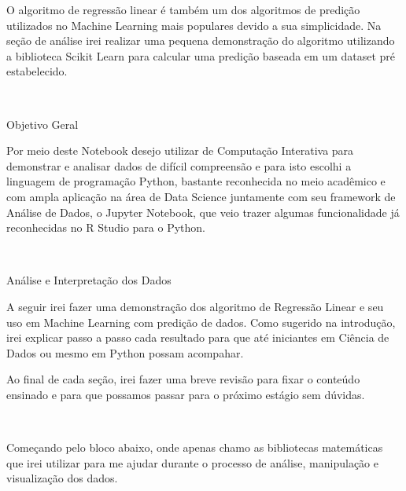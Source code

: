 \documentclass[11pt]{article}
\begin{document}
    O algoritmo de regressão linear é também um dos algoritmos de predição
utilizados no Machine Learning mais populares devido a sua simplicidade.
Na seção de análise irei realizar uma pequena demonstração do algoritmo
utilizando a biblioteca Scikit Learn para calcular uma predição baseada
em um dataset pré estabelecido.

    ~

    Objetivo Geral

    Por meio deste Notebook desejo utilizar de Computação Interativa para
demonstrar e analisar dados de difícil compreensão e para isto escolhi a
linguagem de programação Python, bastante reconhecida no meio acadêmico
e com ampla aplicação na área de Data Science juntamente com seu
framework de Análise de Dados, o Jupyter Notebook, que veio trazer
algumas funcionalidade já reconhecidas no R Studio para o Python.

    ~

    Análise e Interpretação dos Dados

    A seguir irei fazer uma demonstração dos algoritmo de Regressão Linear e
seu uso em Machine Learning com predição de dados. Como sugerido na
introdução, irei explicar passo a passo cada resultado para que até
iniciantes em Ciência de Dados ou mesmo em Python possam acompahar.

    Ao final de cada seção, irei fazer uma breve revisão para fixar o
conteúdo ensinado e para que possamos passar para o próximo estágio sem
dúvidas.

    ~

    Começando pelo bloco abaixo, onde apenas chamo as bibliotecas
matemáticas que irei utilizar para me ajudar durante o processo de
análise, manipulação e visualização dos dados.
\end{document}

